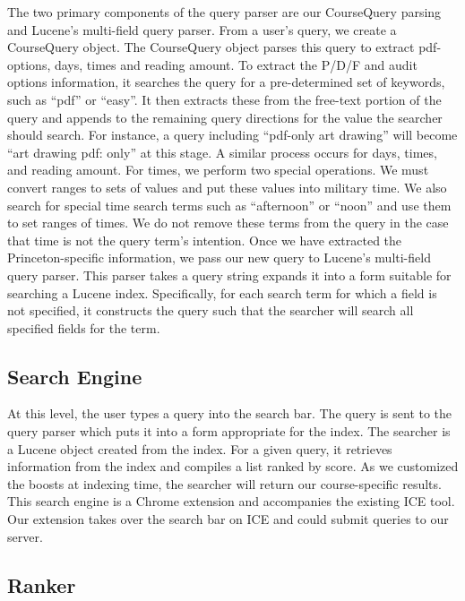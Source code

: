 \documentclass[12pt,letterpaper]{article}
\begin{document}
The two primary components of the query parser are our CourseQuery parsing and Lucene's multi-field query parser. From a user's query, we create a CourseQuery object. The CourseQuery object parses this query to extract pdf-options, days, times and reading amount. To extract the P/D/F and audit options information, it searches the query for a pre-determined set of keywords, such as ``pdf'' or ``easy''. It then extracts these from the free-text portion of the query and appends to the remaining query directions for the value the searcher should search. For instance, a query including ``pdf-only art drawing'' will become ``art drawing pdf: only'' at this stage. A similar process occurs for days, times, and reading amount.
For times, we perform two special operations. We must convert ranges to sets of values and put these values into military time. We also search for special time search terms such as ``afternoon'' or ``noon'' and use them to set ranges of times. We do not remove these terms from the query in the case that time is not the query term's intention. Once we have extracted the Princeton-specific information, we pass our new query to Lucene's multi-field query parser. This parser takes a query string expands it into a form suitable for searching a Lucene index. Specifically, for each search term for which a field is not specified, it constructs the query such that the searcher will search all specified fields for the term. 
	
\subsection{Search Engine}
At this level, the user types a query into the search bar. The query is sent to the query parser which puts it into a form appropriate for the index. The searcher is a Lucene object created from the index. For a given query, it retrieves information from the index and compiles a list ranked by score. As we customized the boosts at indexing time, the searcher will return our course-specific results. This search engine is a Chrome extension and accompanies the existing ICE tool. Our extension takes over the search bar on ICE and could submit queries to our server. 				
		
\subsection{Ranker}
\end{document}
